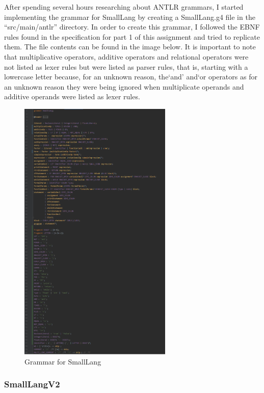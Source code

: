 \documentclass{article}
\newcommand{\quotes}[1]{``#1''}
\begin{document}
			After spending several hours researching about ANTLR grammars, I started implementing the grammar for SmallLang by creating a SmallLang.g4 file in the \quotes{src/main/antlr} directory. In order to create this grammar, I followed the EBNF rules found in the specification for part 1 of this assignment and tried to replicate them. The file contents can be found in the image below. It is important to note that multiplicative operators, additive operators and relational operators were not listed as lexer rules but were listed as parser rules, that is, starting with a lowercase letter because, for an unknown reason, the`and' and`or operators as for an unknown reason they were being ignored when multiplicate operands and additive operands were listed as lexer rules.
			
								\begin{figure}[H]
					\centering
			 			\includegraphics[width=0.65\textwidth]{smallanggr2.png}
			  			\caption{Grammar for SmallLang}
			  			\label{fig:smalllanggr}
					\end{figure}
					
			\subsubsection{SmallLangV2}
			
\end{document}
